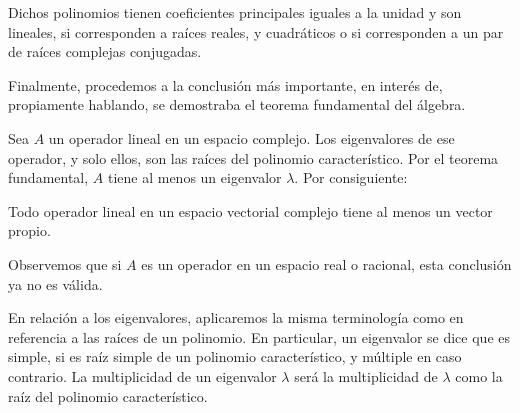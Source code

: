 Dichos polinomios tienen coeficientes principales iguales a la unidad y son lineales, si corresponden a raíces reales, y cuadráticos o si corresponden a un par de raíces complejas conjugadas.

Finalmente, procedemos a la conclusión más importante, en interés de, propiamente hablando, se demostraba el teorema fundamental del álgebra.

Sea $A$ un operador lineal en un espacio complejo. Los eigenvalores de ese operador, y solo ellos, son las raíces del polinomio característico. Por el teorema fundamental, $A$ tiene al menos un eigenvalor $\lambda$. Por consiguiente:

\begin{tcolorbox}[
        theorem style=change break,
        enhanced,
        breakable,
        boxrule=0pt,
        frame hidden,
        borderline west={3pt}{0pt}{black},
        colback=gray!20,
        coltitle=gray!90,
        attach title to upper={\ },
        sharp corners,
        fonttitle=\bfseries,
        fontupper=\normalsize
    ]
    Todo operador lineal en un espacio vectorial complejo tiene al menos un vector propio.
\end{tcolorbox}

Observemos que si $A$ es un operador en un espacio real o racional, esta conclusión ya no es válida.

En relación a los eigenvalores, aplicaremos la misma terminología como en referencia a las raíces de un polinomio. En particular, un eigenvalor se dice que es simple, si es raíz simple de un polinomio característico, y múltiple en caso contrario. La multiplicidad de un eigenvalor $\lambda$ será la multiplicidad de $\lambda$ como la raíz del polinomio característico.